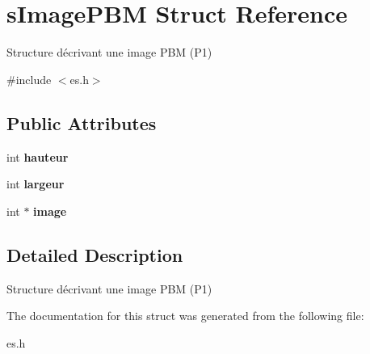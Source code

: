 \hypertarget{structs_image_p_b_m}{}\section{s\+Image\+P\+BM Struct Reference}
\label{structs_image_p_b_m}


Structure décrivant une image P\+BM (P1)  




{\ttfamily \#include $<$es.\+h$>$}

\subsection*{Public Attributes}
\begin{DoxyCompactItemize}
\item 
\mbox{\label{structs_image_p_b_m_aff8ecf2fea76d4a3cc707f6e44f71178}} 
int {\bfseries hauteur}
\item 
\mbox{\label{structs_image_p_b_m_a63e8395b6fef477836ca6e48ea9f00ba}} 
int {\bfseries largeur}
\item 
\mbox{\label{structs_image_p_b_m_a17fbc143b1f07ee75080d63a7650c6b5}} 
int $\ast$ {\bfseries image}
\end{DoxyCompactItemize}


\subsection{Detailed Description}
Structure décrivant une image P\+BM (P1) 

The documentation for this struct was generated from the following file\+:\begin{DoxyCompactItemize}
\item 
es.\+h\end{DoxyCompactItemize}
